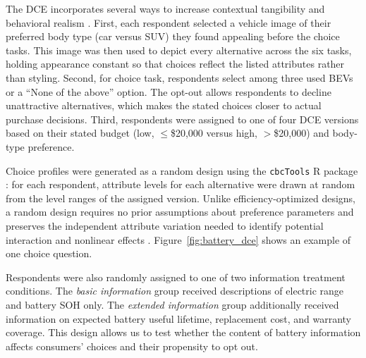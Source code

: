 \documentclass[a4paper,fleqn]{cas-sc}   %
\begin{document}
The DCE incorporates several ways to increase contextual tangibility and behavioral realism \parencite{haghaniHypotheticalBiasStated2021}. First, each respondent selected a vehicle image of their preferred body type (car versus SUV) they found appealing before the choice tasks. This image was then used to depict every alternative across the six tasks, holding appearance constant so that choices reflect the listed attributes rather than styling. Second, for choice task, respondents select among three used BEVs or a ``None of the above'' option. The opt-out allows respondents to decline unattractive alternatives, which makes the stated choices closer to actual purchase decisions. Third, respondents were assigned to one of four DCE versions based on their stated budget (low, $\leq$\$20,000 versus high, $>$\$20,000) and body-type preference. 

Choice profiles were generated as a random design using the \texttt{cbcTools} R package \parencite{helvestonCbcToolsDesignAnalyze2025}: for each respondent, attribute levels for each alternative were drawn at random from the level ranges of the assigned version. Unlike efficiency-optimized designs, a random design requires no prior assumptions about preference parameters and preserves the independent attribute variation needed to identify potential interaction and nonlinear effects \parencite{walker2018d}. Figure~\ref{fig:battery_dce} shows an example of one choice question. 

Respondents were also randomly assigned to one of two information treatment conditions. The \textit{basic information} group received descriptions of electric range and battery SOH only. The \textit{extended information} group additionally received information on expected battery useful lifetime, replacement cost, and warranty coverage. This design allows us to test whether the content of battery information affects consumers' choices and their propensity to opt out. 
\end{document}
